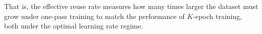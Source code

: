 \vspace{-0.05in}
That is, the effective reuse rate measures how many times larger the dataset must grow under one-pass training to match the performance of $K$-epoch training, both under the optimal learning rate regime.









